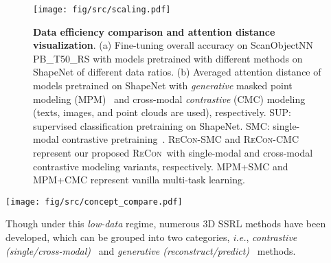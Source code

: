 \documentclass{article}
\theoremstyle{plain}
\theoremstyle{definition}
\theoremstyle{remark}
\def\ie{{\it{i.e.}}}
\def\recon{{\scshape ReCon}}
\begin{document}
\begin{figure}[t!]
    \begin{center}
    \vspace{-2pt}
    \texttt{[image: fig/src/scaling.pdf]}
    \vspace{-22pt}
    \caption{\textbf{Data efficiency comparison and attention distance visualization}. (a) Fine-tuning overall accuracy on ScanObjectNN PB\_T50\_RS with models pretrained with different methods on ShapeNet of different data ratios. (b) Averaged attention distance of models pretrained on ShapeNet with \textit{generative} masked point modeling (MPM)~\citep{PointMAE} and cross-modal \textit{contrastive} (CMC) modeling~\citep{CLIP} (texts, images, and point clouds are used), respectively. SUP: supervised classification pretraining on ShapeNet. SMC: single-modal contrastive pretraining~\citep{SCL20}. \recon-SMC and \recon-CMC represent our proposed \recon~with single-modal and cross-modal contrastive modeling variants, respectively. MPM+SMC and MPM+CMC represent vanilla multi-task learning.
    }\label{fig:data_scaling}
    \vspace{-24pt}
    \end{center}
\end{figure} \begin{figure*}[t!]
    \begin{center}
    \vspace{-5pt}
    \texttt{[image: fig/src/concept\_compare.pdf]}
    \vspace{-12pt}
    \caption{\textbf{Concept comparison of \textit{contrastive}, \textit{generative}, and our \recon~paradigms}. Here, we illustrate the methods in a unified view of knowledge distillation (see Sec.~\ref{sec:kd_view}). (a) Contrastive students are trained to learn \textit{invariance} from the teacher. (b) Generative masked modeling encourages students to reconstruct clean signals provided by the teacher. (c) \recon~unifies the two paradigms by learning from multi-teachers, where the generative local student is also a ``teacher" that guides the contrastive global student.
    }\label{fig:concept} 
    \end{center}
    \vspace{-18pt}
\end{figure*} Though under this \textit{low-data} regime, numerous 3D SSRL methods have been developed, which can be grouped into 
two categories, \ie, \textit{contrastive (single/cross-modal)}~\citep{PointContrast20,DepthContrast21,4DContrast22,TupleInfoNCE21,CrossPoint22} and \textit{generative (reconstruct/predict)}~\citep{OcCo,PointBERT,PointMAE} methods.
\end{document}

